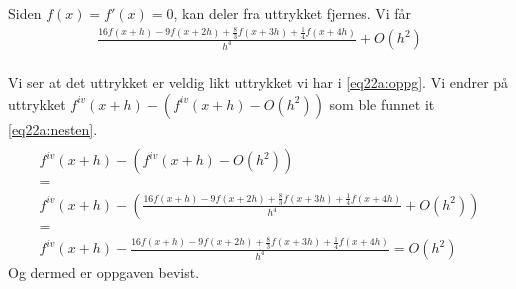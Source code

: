 
Siden $f(x) = f'(x) = 0$, kan deler fra uttrykket fjernes. Vi får
\begin{multline}
\frac{16f(x+h)-9f(x+2h)+\frac{8}{3}f(x+3h)+\frac{1}{4}f(x+4h)}{h^4}+O(h^2) \label{eq22a:nesten} \\
\end{multline}

Vi ser at det uttrykket er veldig likt uttrykket vi har i \ref{eq22a:oppg}. Vi endrer på uttrykket ${f^{iv}}(x + h) - ({f^{iv}}(x + h) - O(h^2))$ som ble funnet it \ref{eq22a:nesten}. 
\begin{multline}
\\ {f^{iv}}(x + h) - ({f^{iv}}(x + h) - O(h^2))  \\
= \\
{f^{iv}}(x + h) - (\frac{16f(x+h)-9f(x+2h)+\frac{8}{3}f(x+3h)+\frac{1}{4}f(x+4h)}{h^4}+O(h^2)) \\ 
= \\
{f^{iv}}(x + h) - \frac{16f(x+h)-9f(x+2h)+\frac{8}{3}f(x+3h)+\frac{1}{4}f(x+4h)}{h^4} = O(h^2) \label{eq22a:ferdig}
\end{multline}
Og dermed er oppgaven bevist. 




